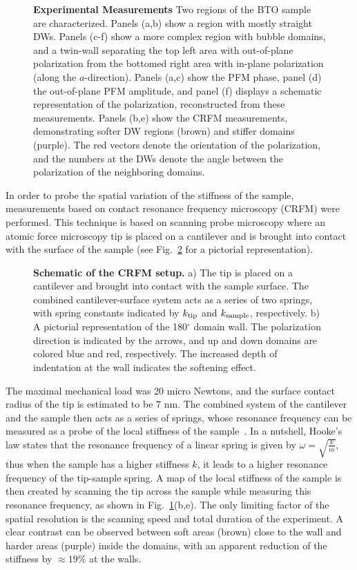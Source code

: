 \begin{figure}
	\caption{\label{fig:BTO_experiment} {\bf Experimental Measurements} Two regions of the BTO sample are characterized. Panels (a,b) show a region with mostly straight DWs. Panels (c-f) show a more complex region with bubble domains, and a twin-wall separating the top left area with out-of-plane polarization from the bottomed right area with in-plane polarization (along the $a$-direction). Panels (a,c) show the PFM phase, panel (d) the out-of-plane PFM amplitude, and panel (f) displays a schematic representation of the polarization, reconstructed from these measurements. Panels (b,e) show the CRFM measurements, demonstrating softer DW regions (brown) and stiffer domains (purple). The red vectors denote the orientation of the polarization, and the numbers at the DWs denote the angle between the polarization of the neighboring domains.}
\end{figure}

In order to probe the spatial variation of the stiffness of the sample, measurements based on contact resonance frequency microscopy (CRFM) were performed.
This technique is based on scanning probe microscopy where an atomic force microscopy tip is placed on a cantilever and is brought into contact with the surface of the sample (see Fig.~\ref{fig:BTO_experimental_schematic} for a pictorial representation).
\begin{figure}
	\caption{\label{fig:BTO_experimental_schematic} {\bf Schematic of the CRFM setup.} a) The tip is placed on a cantilever and brought into contact with the sample surface. The combined cantilever-surface system acts as a series of two springs, with spring constants indicated by $k_{\rm tip}$ and $k_{\rm sample}$, respectively. b) A pictorial representation of the 180$^\circ$ domain wall. The polarization direction is indicated by the arrows, and up and down domains are colored blue and red, respectively. The increased depth of indentation at the wall indicates the softening effect.}
\end{figure}
The maximal mechanical load was 20 micro Newtons, and the surface contact radius of the tip is estimated to be 7 nm.
The combined system of the cantilever and the sample then acts as a series of springs, whose resonance frequency can be measured as a probe of the local stiffness of the sample~\cite{Rabe2000}.
In a nutshell, Hooke's law states that the resonance frequency of a linear spring is given by $\omega = \sqrt{\frac{k}{m}}$, thus when the sample has a higher stiffness $k$, it leads to a higher resonance frequency of the tip-sample spring.
A map of the local stiffness of the sample is then created by scanning the tip across the sample while measuring this resonance frequency, as shown in Fig.~\ref{fig:BTO_experiment}(b,e).
The only limiting factor of the spatial resolution is the scanning speed and total duration of the experiment.  
A clear contrast can be observed between soft areas (brown) close to the wall and harder areas (purple) inside the domains, with an apparent reduction of the stiffness by $\approx 19\%$ at the walls.

